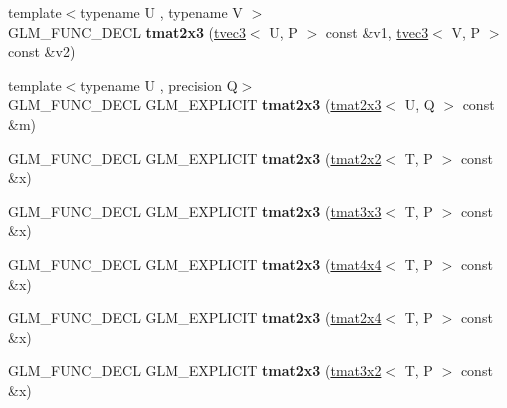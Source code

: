 \begin{DoxyCompactItemize}
\item 
\mbox{\label{structglm_1_1tmat2x3_a7155a096b04a8577bbfc344a163b07c5}} 
{\footnotesize template$<$typename U , typename V $>$ }\\G\+L\+M\+\_\+\+F\+U\+N\+C\+\_\+\+D\+E\+CL {\bfseries tmat2x3} (\hyperlink{structglm_1_1tvec3}{tvec3}$<$ U, P $>$ const \&v1, \hyperlink{structglm_1_1tvec3}{tvec3}$<$ V, P $>$ const \&v2)
\item 
\mbox{\label{structglm_1_1tmat2x3_a5cd6c10b4d3a99be39f63ccbcc57b210}} 
{\footnotesize template$<$typename U , precision Q$>$ }\\G\+L\+M\+\_\+\+F\+U\+N\+C\+\_\+\+D\+E\+CL G\+L\+M\+\_\+\+E\+X\+P\+L\+I\+C\+IT {\bfseries tmat2x3} (\hyperlink{structglm_1_1tmat2x3}{tmat2x3}$<$ U, Q $>$ const \&m)
\item 
\mbox{\label{structglm_1_1tmat2x3_a3bc2693e1ce02cbd48703e2c7c6f75d6}} 
G\+L\+M\+\_\+\+F\+U\+N\+C\+\_\+\+D\+E\+CL G\+L\+M\+\_\+\+E\+X\+P\+L\+I\+C\+IT {\bfseries tmat2x3} (\hyperlink{structglm_1_1tmat2x2}{tmat2x2}$<$ T, P $>$ const \&x)
\item 
\mbox{\label{structglm_1_1tmat2x3_a8c8c9b6b9ab00983351a4ffa5f1c1c80}} 
G\+L\+M\+\_\+\+F\+U\+N\+C\+\_\+\+D\+E\+CL G\+L\+M\+\_\+\+E\+X\+P\+L\+I\+C\+IT {\bfseries tmat2x3} (\hyperlink{structglm_1_1tmat3x3}{tmat3x3}$<$ T, P $>$ const \&x)
\item 
\mbox{\label{structglm_1_1tmat2x3_a8797fae4349161789ddaf71c932a1a49}} 
G\+L\+M\+\_\+\+F\+U\+N\+C\+\_\+\+D\+E\+CL G\+L\+M\+\_\+\+E\+X\+P\+L\+I\+C\+IT {\bfseries tmat2x3} (\hyperlink{structglm_1_1tmat4x4}{tmat4x4}$<$ T, P $>$ const \&x)
\item 
\mbox{\label{structglm_1_1tmat2x3_a23808a1c5d5674c6ebb0486c2ae2fe81}} 
G\+L\+M\+\_\+\+F\+U\+N\+C\+\_\+\+D\+E\+CL G\+L\+M\+\_\+\+E\+X\+P\+L\+I\+C\+IT {\bfseries tmat2x3} (\hyperlink{structglm_1_1tmat2x4}{tmat2x4}$<$ T, P $>$ const \&x)
\item 
\mbox{\label{structglm_1_1tmat2x3_a2743481f193e33c3732697620ba9a0d7}} 
G\+L\+M\+\_\+\+F\+U\+N\+C\+\_\+\+D\+E\+CL G\+L\+M\+\_\+\+E\+X\+P\+L\+I\+C\+IT {\bfseries tmat2x3} (\hyperlink{structglm_1_1tmat3x2}{tmat3x2}$<$ T, P $>$ const \&x)

\end{DoxyCompactItemize}
